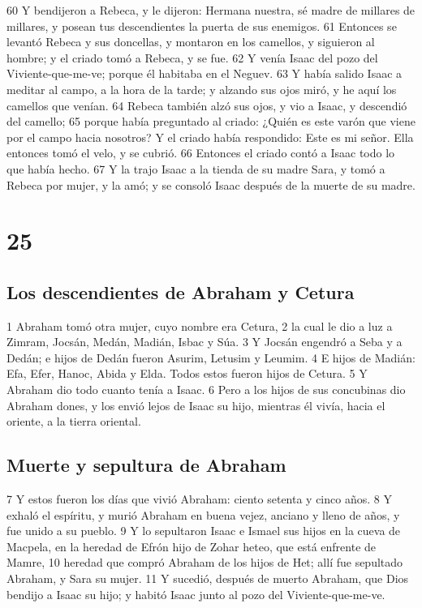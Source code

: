 60 Y bendijeron a Rebeca, y le dijeron: Hermana nuestra, sé madre de millares de millares, y posean tus descendientes la puerta de sus enemigos.
61 Entonces se levantó Rebeca y sus doncellas, y montaron en los camellos, y siguieron al hombre; y el criado tomó a Rebeca, y se fue.
62 Y venía Isaac del pozo del Viviente-que-me-ve; porque él habitaba en el Neguev.
63 Y había salido Isaac a meditar al campo, a la hora de la tarde; y alzando sus ojos miró, y he aquí los camellos que venían.
64 Rebeca también alzó sus ojos, y vio a Isaac, y descendió del camello;
65 porque había preguntado al criado: ¿Quién es este varón que viene por el campo hacia nosotros? Y el criado había respondido: Este es mi señor. Ella entonces tomó el velo, y se cubrió.
66 Entonces el criado contó a Isaac todo lo que había hecho.
67 Y la trajo Isaac a la tienda de su madre Sara, y tomó a Rebeca por mujer, y la amó; y se consoló Isaac después de la muerte de su madre.

\chapter{25}

\section{Los descendientes de Abraham y Cetura}

1 Abraham tomó otra mujer, cuyo nombre era Cetura,
2 la cual le dio a luz a Zimram, Jocsán, Medán, Madián, Isbac y Súa.
3 Y Jocsán engendró a Seba y a Dedán; e hijos de Dedán fueron Asurim, Letusim y Leumim.
4 E hijos de Madián: Efa, Efer, Hanoc, Abida y Elda. Todos estos fueron hijos de Cetura.
5 Y Abraham dio todo cuanto tenía a Isaac.
6 Pero a los hijos de sus concubinas dio Abraham dones, y los envió lejos de Isaac su hijo, mientras él vivía, hacia el oriente, a la tierra oriental.

\section{Muerte y sepultura de Abraham}

7 Y estos fueron los días que vivió Abraham: ciento setenta y cinco años.
8 Y exhaló el espíritu, y murió Abraham en buena vejez, anciano y lleno de años, y fue unido a su pueblo.
9 Y lo sepultaron Isaac e Ismael sus hijos en la cueva de Macpela, en la heredad de Efrón hijo de Zohar heteo, que está enfrente de Mamre,
10 heredad que compró Abraham de los hijos de Het; allí fue sepultado Abraham, y Sara su mujer.
11 Y sucedió, después de muerto Abraham, que Dios bendijo a Isaac su hijo; y habitó Isaac junto al pozo del Viviente-que-me-ve.

